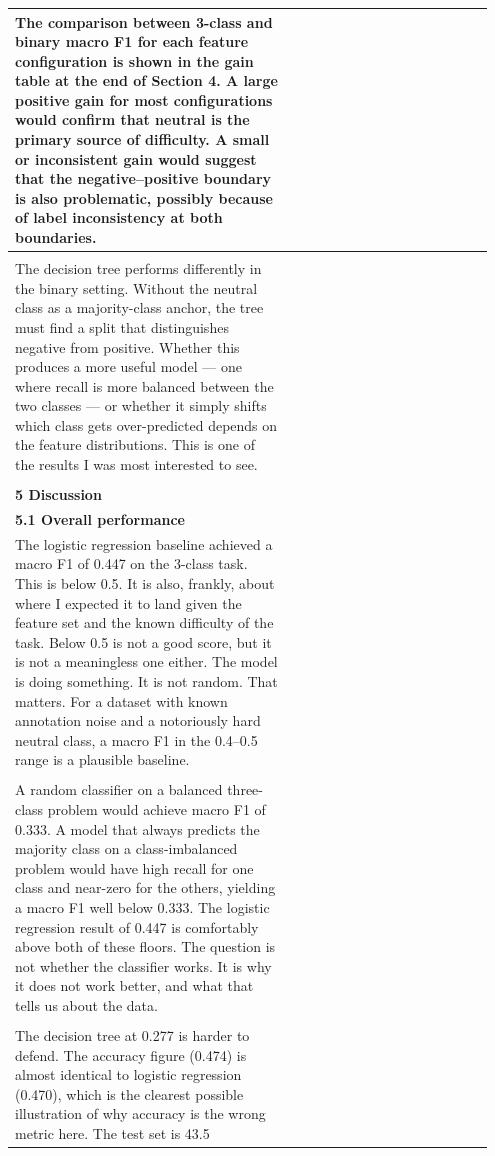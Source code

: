 \documentclass[11pt]{article}
\begin{document}
\begin{longtable}{|p{0.55\linewidth}|p{0.40\linewidth}|}
\hline
The comparison between 3-class and binary macro F1 for each feature configuration is shown in the gain table at the end of Section 4. A large positive gain for most configurations would confirm that neutral is the primary source of difficulty. A small or inconsistent gain would suggest that the negative--positive boundary is also problematic, possibly because of label inconsistency at both boundaries. & \\[2pt]
\hline
\rule{0pt}{3.5cm} & \\
\hline
The decision tree performs differently in the binary setting. Without the neutral class as a majority-class anchor, the tree must find a split that distinguishes negative from positive. Whether this produces a more useful model --- one where recall is more balanced between the two classes --- or whether it simply shifts which class gets over-predicted depends on the feature distributions. This is one of the results I was most interested to see. & \\[2pt]
\hline
\rule{0pt}{3.5cm} & \\
\hline
\multicolumn{2}{|l|}{\textbf{5 Discussion}} \\[2pt]
\hline
\multicolumn{2}{|l|}{\textbf{5.1 Overall performance}} \\[2pt]
\hline
The logistic regression baseline achieved a macro F1 of 0.447 on the 3-class task. This is below 0.5. It is also, frankly, about where I expected it to land given the feature set and the known difficulty of the task. Below 0.5 is not a good score, but it is not a meaningless one either. The model is doing something. It is not random. That matters. For a dataset with known annotation noise and a notoriously hard neutral class, a macro F1 in the 0.4--0.5 range is a plausible baseline. & \\[2pt]
\hline
\rule{0pt}{3.5cm} & \\
\hline
A random classifier on a balanced three-class problem would achieve macro F1 of 0.333. A model that always predicts the majority class on a class-imbalanced problem would have high recall for one class and near-zero for the others, yielding a macro F1 well below 0.333. The logistic regression result of 0.447 is comfortably above both of these floors. The question is not whether the classifier works. It is why it does not work better, and what that tells us about the data. & \\[2pt]
\hline
\rule{0pt}{3.5cm} & \\
\hline
The decision tree at 0.277 is harder to defend. The accuracy figure (0.474) is almost identical to logistic regression (0.470), which is the clearest possible illustration of why accuracy is the wrong metric here. The test set is 43.5 & \\[2pt]

\end{longtable}
\end{document}
